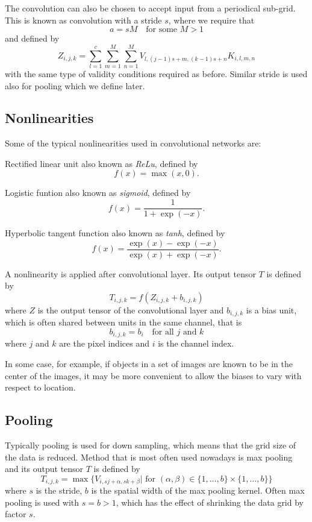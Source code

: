 \documentclass[]{article}
\begin{document}
The convolution can also be chosen to accept input from a periodical sub-grid.
This is known as convolution with a stride $s$, where we require that
\[
a = s M \quad \text{for some $M > 1$}
\]
and defined by
\[
Z_{i, j, k} = \sum_{l=1}^c \sum_{m = 1}^M \sum_{n=1}^M
V_{l, (j -1) s + m, (k-1) s + n} K_{i, l, m, n}
\]
with the same type of validity conditions required as before. Similar stride is used
also for pooling which we define later.

\subsection{Nonlinearities}
Some of the typical nonlinearities used in convolutional networks are:

Rectified linear unit also known as \emph{ReLu}, defined by
\[
f(x) = \max(x, 0).
\]

Logistic funtion also known as \emph{sigmoid}, defined by
\[
f(x) = \frac{1}{1 + \exp(-x)}.
\]

Hyperbolic tangent function also known as \emph{tanh}, defined by
\[
f(x) = \frac{\exp(x) - \exp(-x)}{\exp(x) + \exp(-x)}.
\]

A nonlinearity is applied after convolutional layer. Its output tensor $T$ is defined by
\[
T_{i,j,k} = f(Z_{i, j, k} + b_{i,j,k})
\]
where $Z$ is the output tensor of the convolutional layer and $b_{i, j, k}$ is a
bias unit, which is often shared between units in the same channel, that is
\[
b_{i, j, k} = b_i \quad \text{for all $j$ and $k$}
\]
where $j$ and $k$ are the pixel indices and $i$ is the channel index.

In some case, for example, if objects in a set of images are known to be in the
center of the images, it may be more convenient to allow the biases to vary with
respect to location.

\subsection{Pooling}
Typically pooling is used for down sampling, which means that the grid size of
the data is reduced. Method that is most often used nowadays is max pooling and
its output tensor $T$ is defined by
\[
T_{i, j,k} = \max \{V_{i, s j + \alpha, s k + \beta} |
\text{ for $(\alpha, \beta) \in \{ 1,\ldots, b\} \times  \{ 1,\ldots, b\} $} \}
\]
where $s$ is the stride, $b$ is the spatial width of the max pooling kernel. Often
max pooling is used with $s = b > 1$, which has the effect of shrinking the data
grid by factor $s$.
\end{document}

